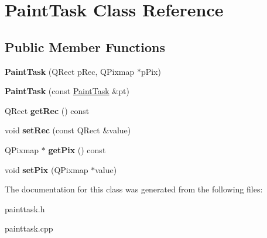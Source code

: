 \hypertarget{class_paint_task}{\section{Paint\-Task Class Reference}
\label{class_paint_task}
}
\subsection*{Public Member Functions}
\begin{DoxyCompactItemize}
\item 
\hypertarget{class_paint_task_a95c518e8d1f1b47513fcbb7d33efae92}{{\bfseries Paint\-Task} (Q\-Rect p\-Rec, Q\-Pixmap $\ast$p\-Pix)}\label{class_paint_task_a95c518e8d1f1b47513fcbb7d33efae92}

\item 
\hypertarget{class_paint_task_aa6a868686cea358b91056a7bdd17c39c}{{\bfseries Paint\-Task} (const \hyperlink{class_paint_task}{Paint\-Task} \&pt)}\label{class_paint_task_aa6a868686cea358b91056a7bdd17c39c}

\item 
\hypertarget{class_paint_task_a2cfc517eefcaf5190c3c138402edf24a}{Q\-Rect {\bfseries get\-Rec} () const }\label{class_paint_task_a2cfc517eefcaf5190c3c138402edf24a}

\item 
\hypertarget{class_paint_task_a589af1cb82beb781e4cc34027f73bdf0}{void {\bfseries set\-Rec} (const Q\-Rect \&value)}\label{class_paint_task_a589af1cb82beb781e4cc34027f73bdf0}

\item 
\hypertarget{class_paint_task_ad32c94ebc7a9b5640179ccbf00a0398e}{Q\-Pixmap $\ast$ {\bfseries get\-Pix} () const }\label{class_paint_task_ad32c94ebc7a9b5640179ccbf00a0398e}

\item 
\hypertarget{class_paint_task_aba6f4430d04a3202950719145f89597c}{void {\bfseries set\-Pix} (Q\-Pixmap $\ast$value)}\label{class_paint_task_aba6f4430d04a3202950719145f89597c}

\end{DoxyCompactItemize}


The documentation for this class was generated from the following files\-:\begin{DoxyCompactItemize}
\item 
painttask.\-h\item 
painttask.\-cpp\end{DoxyCompactItemize}
